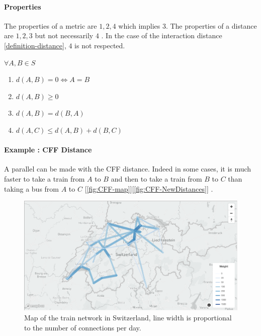 \documentclass[a4paper,11pt,twoside,openright]{report}
\begin{document}
\paragraph{Properties} The properties of a metric are $1, 2, 4$ which implies
$3$. The properties of a distance are $1,2,3$ but not necessarily $4$
\cite{Greenhoe2016}. In the case of the interaction distance
\autoref{definition-distance}, $4$ is not respected.

$\forall A,B \in S$
\begin{enumerate}
\item $d(A,B) = 0 \Leftrightarrow A = B$
\item $d(A,B) \geq 0$
\item $d(A,B) = d(B,A)$
 \color{red} \item$d(A, C) \leq d(A,B) + d(B,C)$ \color{black}
\end{enumerate}

\paragraph{Example : CFF Distance}
A parallel can be made with the CFF distance. Indeed in some cases, it is much
faster to take a train from $A$ to $B$ and then to take a train from $B$ to $C$
than taking a bus from $A$ to $C$ [\autoref{fig:CFF-map}][\autoref{fig:CFF-NewDistances}] . 

\begin{figure}[!h] 
\centering
\includegraphics[width=450pt]{figures/mapCFF}
\caption{Map of the train network in Switzerland, line width is proportional to
 the number of connections per day.} \label{fig:CFF-map}
\end{figure}
\end{document}
